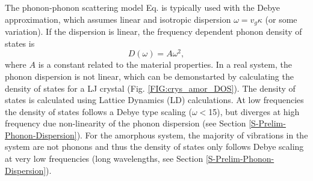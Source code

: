 \documentclass[letterpaper,12pt]{article}
\begin{document}
The phonon-phonon scattering model Eq$.$ is typically used with the Debye approximation, which assumes linear and isotropic dispersion $\omega = v_g\kappa$ (or some variation\cite{callaway1959,holland1963}). If the dispersion is linear, the frequency dependent phonon density of states is
\begin{equation}\label{EQ:M:debye_DOS}
D(\omega) = A\omega^2,
\end{equation}
where $A$ is a constant related to the material properties.\cite{ashcroft1976} In a real system, the phonon dispersion is not linear, which can be demonstarted by calculating the density of states for a LJ crystal (Fig$.$ \ref{FIG:crys_amor_DOS}). The density of states is calculated using Lattice Dynamics (LD) calculations.\cite{dove1993} At low frequencies the density of states follows a Debye type scaling ($\omega<$15), but diverges at high frequency due non-linearity of the phonon dispersion (see Section \ref{S-Prelim-Phonon-Dispersion}). For the amorphous system, the majority of vibrations in the system are not phonons and thus the density of states only follows Debye scaling at very low frequencies (long wavelengths, see Section \ref{S-Prelim-Phonon-Dispersion}).
\end{document}
